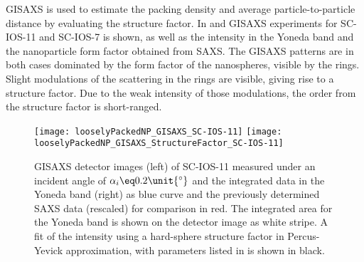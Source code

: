 \documentclass[\main/dresen_thesis.tex]{subfiles}
\begin{document}
  \label{sec:looselyPackedNS:layers:gisaxs}
  GISAXS is used to estimate the packing density and average particle-to-particle distance by evaluating the structure factor.
  In  and  GISAXS experiments for SC-IOS-11 and SC-IOS-7 is shown, as well as the intensity in the Yoneda band and the nanoparticle form factor obtained from SAXS.
  The GISAXS patterns are in both cases dominated by the form factor of the nanospheres, visible by the rings.
  Slight modulations of the scattering in the rings are visible, giving rise to a structure factor.
  Due to the weak intensity of those modulations, the order from the structure factor is short-ranged.
  \begin{figure}[tb]
    \centering
    \texttt{[image: looselyPackedNP\_GISAXS\_SC-IOS-11]}
    \texttt{[image: looselyPackedNP\_GISAXS\_StructureFactor\_SC-IOS-11]}
    \caption{\label{fig:looselyPackedNP:layer:gisaxsSC_IOS_11}GISAXS detector images (left) of SC-IOS-11 measured under an incident angle of $\alpha_i \eq 0.2 \unit{^\circ}$ and the integrated data in the Yoneda band (right) as blue curve and the previously determined SAXS data (rescaled) for comparison in red. The integrated area for the Yoneda band is shown on the detector image as white stripe. A fit of the intensity using a hard-sphere structure factor in Percus-Yevick approximation, with parameters listed in  is shown in black.}
  \end{figure}
\end{document}
